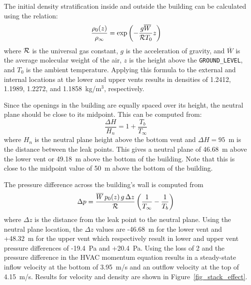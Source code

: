 \documentclass[11pt]{book}
\newcommand{\ct}{\tt\small}
\newcommand{\be}{\begin{equation}}
\newcommand{\ee}{\end{equation}}
\begin{document}
The initial density stratification inside and outside the building can be calculated using the relation:
\be
   \frac{\rho_0(z)}{\rho_\infty} = \exp \left(- \frac{g \overline{W}}{{\cal R} T_0} z \right)
\ee
where $\cal R$ is the universal gas constant, $g$ is the acceleration of gravity, and $\overline{W}$ is the average molecular weight of the air, $z$ is the height above the {\ct GROUND\_LEVEL}, and $T_0$ is the ambient temperature.
Applying this formula to the external and internal locations at the lower and upper vents results in densities of 1.2412, 1.1989, 1.2272, and 1.1858~kg/m$^3$, respectively.

Since the openings in the building are equally spaced over its height, the neutral plane should be close to its midpoint. This can be computed from:
\be \frac{\Delta H }{H_n} = 1 + \frac{T_b}{T_\infty} \ee
where $H_n$ is the neutral plane height above the bottom vent and $\Delta H=95$~m is the distance between the leak points.  This gives a neutral plane of 46.68~m above the lower vent or 49.18~m above the bottom of the building.  Note that this is close to the midpoint value of 50~m above the bottom of the building.

The pressure difference across the building's wall is computed from
\be
   \Delta p = \frac{\overline{W} \, p_0(z) \, g \, \Delta z} {\cal R} \left( \frac{1}{T_\infty} - \frac{1}{T_b} \right)
\ee
where $ \Delta z$ is the distance from the leak point to the neutral plane.  Using the neutral plane location, the $ \Delta z$ values are -46.68~m for the lower vent and +48.32~m for the upper vent which respectively result in lower and upper vent pressure differences of -19.4~Pa and +20.4~Pa.  Using the loss of 2 and the pressure difference in the HVAC momentum equation results in a steady-state inflow velocity at the bottom of 3.95~m/s and an outflow velocity at the top of 4.15~m/s. Results for velocity and density are shown in Figure~\ref{fig_stack_effect}.
\end{document}
